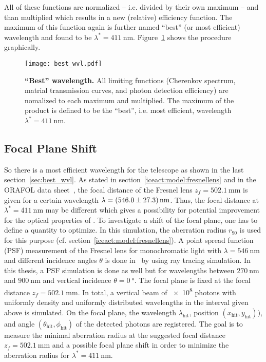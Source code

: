 All of these functions are normalized -- i.e. divided by their own maximum -- and than multiplied which results in a new (relative) efficiency function. The maximum of this function again is further named \enquote{best} (or most efficient) wavelength and found to be $\lambda^\ast = \SI{411}{\nano\meter}$. Figure~\ref{best_wvl} shows the procedure graphically. 

\begin{figure}[H]
	\centering
	\texttt{[image: best\_wvl.pdf]}
	\caption[\enquote{Best} wavelength]{\textbf{\enquote{Best} wavelength.} All limiting functions (Cherenkov spectrum, matrial transmission curves, and photon detection efficiency) are nomalized to each maximum and multiplied. The maximum of the product is defined to be the \enquote{best}, i.e. most efficient, wavelength $\lambda^\ast=\SI{411}{\nano\meter}$.}
	\label{best_wvl}
\end{figure}

\subsection{Focal Plane Shift}\label{sec:focalplaneshift}

So there is a most efficient wavelength for the \iceact telescope as shown in the last section~\ref{sec:best_wvl}. As stated in section~\ref{iceact:model:fresnellens} and in the ORAFOL data sheet~\cite{iceact:fresnellens:datasheet}, the focal distance of the Fresnel lens $z_f=\SI{502.1}{\milli\meter}$ is given for a certain wavelength $\lambda=\SI{546+-27.3}{\nano\meter}$. Thus, the focal distance at $\lambda^\ast=\SI{411}{\nano\meter}$ may be different which gives a possibility for potential improvement for the optical properties of \iceact. To investigate a shift of the focal plane, one has to define a quantity to optimize. In this simulation, the aberration radius $r_{90}$ is used for this purpose (cf. section~\ref{iceact:model:fresnellens}). A point spread function (PSF) measurement of the Fresnel lens for monochromatic light with $\lambda=\SI{546}{\nano\meter}$ and different incidence angles $\theta$ is done in~\cite{famous:niggemann} by using ray tracing simulation. In this thesis, a PSF simulation is done as well but for wavelengths between $\SI{270}{\nano\meter}$ and $\SI{900}{\nano\meter}$ and vertical incidence $\theta=\SI{0}{\degree}$. The focal plane is fixed at the focal distance $z_f=\SI{502.1}{\milli\meter}$. In total, a vertical beam of \num{e8} photons with uniformly density and uniformly distributed wavelengths in the interval given above is simulated. On the focal plane, the wavelength $\lambda_\text{hit}$, position $(x_\text{hit},y_\text{hit}))$, and angle $(\theta_\text{hit},\phi_\text{hit})$ of the detected photons are registered. The goal is to measure the minimal aberration radius at the suggested focal distance $z_f=\SI{502.1}{\milli\meter}$ and a possible focal plane shift in order to minimize the aberration radius for $\lambda^\ast=\SI{411}{\nano\meter}$.\\

